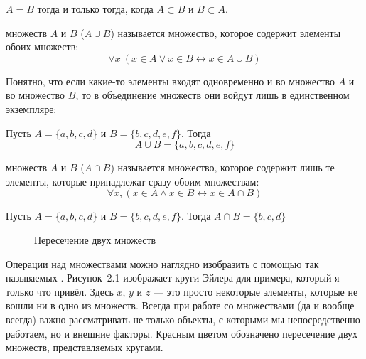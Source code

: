 \begin{thm}
$A=B$ тогда и только тогда, когда $A\subset B$ и $B \subset A$.
\end{thm}

\begin{definition}
 множеств $A$ и $B$ ($A\cup B$) называется множество, которое содержит элементы обоих множеств:
$$\forall x\ (x\in A \vee x \in B \leftrightarrow x\in A\cup B)$$
\end{definition}

Понятно, что если какие-то элементы входят одновременно и во множество $A$ и во множество $B$, то в объединение множеств они войдут лишь в единственном экземпляре:

\begin{example}
Пусть $A = \{a, b, c, d\}$ и $B = \{b, c, d, e, f\}$. Тогда
$$A\cup B = \{a, b, c, d, e, f\}$$
\end{example}

\begin{definition}
 множеств $A$ и $B$ ($A\cap B$) называется множество, которое содержит лишь те элементы, которые принадлежат сразу обоим множествам:
$$\forall x, (x\in A \wedge x \in B \leftrightarrow x\in A\cap B)$$
\end{definition}

\begin{example}
Пусть $A = \{a, b, c, d\}$ и $B = \{b, c, d, e, f\}$. Тогда $A\cap B = \{b, c, d\}$
\end{example}

\begin{figure}[h]
\centering
\def\seta{(-1,0) circle (2)}
\def\setb{(1,0) circle (2)}
\caption{Пересечение двух множеств}
\end{figure}

Операции над множествами можно наглядно изобразить с помощью так называемых . Рисунок~2.1 изображает круги Эйлера для примера, который я только что привёл. Здесь $x$, $y$ и $z$ — это просто некоторые элементы, которые не вошли ни в одно из множеств. Всегда при работе со множествами (да и вообще всегда) важно рассматривать не только объекты, с которыми мы непосредственно работаем, но и внешние факторы. Красным цветом обозначено пересечение двух множеств, представляемых кругами.


